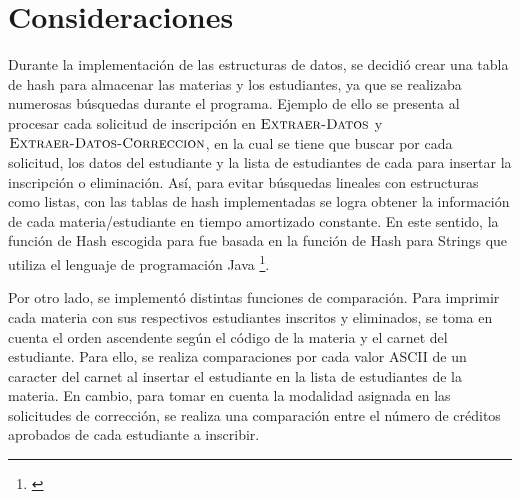 \documentclass[11pt]{article}
\begin{document}
\section{Consideraciones}
Durante la implementación de las estructuras de datos, se decidió crear una tabla de hash para
almacenar las materias y los estudiantes, ya que se realizaba numerosas búsquedas durante el programa. 
Ejemplo de ello se presenta al procesar cada solicitud de inscripción en $\textnormal{\scshape Extraer-Datos}$
y $\textnormal{\scshape Extraer-Datos-Correccion}$, en la cual se tiene que buscar por cada solicitud, los datos
del estudiante y la lista de estudiantes de cada  para insertar la inscripción o eliminación. 
Así, para evitar búsquedas lineales con estructuras como listas, con las tablas de hash implementadas se logra 
obtener la información de cada materia/estudiante en tiempo amortizado constante. En este sentido, la función 
de Hash escogida para  fue basada en la función de Hash para Strings que utiliza el lenguaje 
de programación Java \footnote{\href{https://cseweb.ucsd.edu/~kube/cls/100/Lectures/lec16/lec16-15.html}{}}.

Por otro lado, se implementó distintas funciones de comparación. Para imprimir cada materia con sus
respectivos estudiantes inscritos y eliminados, se toma en cuenta el orden ascendente según el código
de la materia y el carnet del estudiante. Para ello, se realiza comparaciones por cada valor ASCII de 
un caracter del carnet al insertar el estudiante en la lista de estudiantes de la materia. 
En cambio, para tomar en cuenta la modalidad asignada en las solicitudes de corrección, se realiza una 
comparación entre el número de créditos aprobados de cada estudiante a inscribir. 
\end{document}
